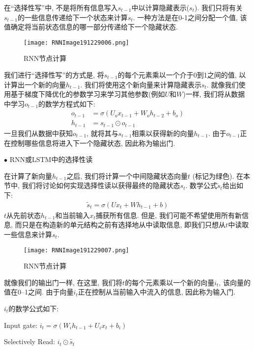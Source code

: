 \begin{example}
在“选择性写”中, 不是将所有信息写入$s_{t-1}$中以计算隐藏表示($s_t$). 我们只将有关$s_{t-1}$的一些信息传递给下一个状态来计算$s_t$.
一种方法是在0-1之间分配一个值, 该值确定将当前状态信息的哪一部分传递给下一个隐藏状态.
\begin{figure}[H]
\centering
\texttt{[image: RNNImage191229006.png]}
\caption{RNN节点计算}
\label{RNNImage191229006}\vspace{-0.4cm}
\end{figure}
我们进行“选择性写”的方式是, 将$s_{t-1}$的每个元素乘以一个介于0到1之间的值, 以计算出一个新的向量$h_{t-1}$. 我们将使用这个新向量来计算隐藏表示$s_t$.
就像我们使用基于梯度下降优化的参数学习来学习其他参数(例如$U$和$W$)一样, 我们将从数据中学习$o_{t-1}$的数学方程式如下:
\begin{align}
o_{t-1}&=\sigma\left(U_{o} x_{t-1}+W_{o} h_{t-2}+b_{o}\right)\\
h_{t-1}&=s_{t-1} \odot o_{t-1}
\end{align}
一旦我们从数据中获知$o_{t-1}$, 就将其与$s_{t-1}$相乘以获得新的向量$h_{t-1}$. 由于$o_{t-1}$正在控制哪些信息将进入下一个隐藏状态, 因此称为输出门.

$\bullet$ RNN或LSTM中的选择性读

在计算了新向量$h_{t-1}$之后, 我们将计算一个中间隐藏状态向量$t$ (标记为绿色). 在本节中, 我们将讨论如何实现选择性读以获得最终的隐藏状态$s_t$.
数学公式$\tilde{s}_{t}$给出如下:
\begin{align}
  \tilde{s}_{t}=\sigma\left(U x_{t}+W h_{t-1}+b\right)
\end{align}
$t$从先前状态$h_{t-1}$和当前输入$x_t$捕获所有信息.
但是, 我们可能不希望使用所有新信息, 而只是在构造新的单元结构之前有选择地从中读取信息,
即我们只想从$t$中读取一些信息来计算$s_t$.
\begin{figure}[H]
\centering
\texttt{[image: RNNImage191229007.png]}
\caption{RNN节点计算}
\label{RNNImage191229007}\vspace{-0.4cm}
\end{figure}
就像我们的输出门一样, 在这里, 我们将$t$的每个元素乘以一个新的向量$i_t$, 该向量的值在0–1之间. 由于向量$i_t$正在控制从当前输入中流入的信息, 因此称为输入门.

$i_t$的数学公式如下:

\quad Input gate: $i_{t}=\sigma\left(W_{i} h_{t-1}+U_{i} x_{t}+b_{i}\right)$

\quad Selectively Read: $i_{t} \odot \tilde{s_{t}}$


\end{example}
